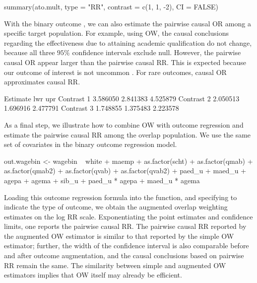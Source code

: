 \begin{example}
summary(ato.mult, type = "RR", contrast = c(1, 1, -2), CI = FALSE)
\end{example}

 
With the binary outcome , we can also estimate the pairwise causal OR among a specific target population. For example, using OW, the causal conclusions regarding the effectiveness due to attaining academic qualification do not change, because all three $95\%$ confidence intervals exclude null. However, the pairwise causal OR appear larger than the pairwise causal RR. This is expected because our outcome of interest is not uncommon \citep{nurminen1995use}. For rare outcomes, causal OR approximates causal RR. 


\begin{Soutput}
          Estimate      lwr      upr
Contrast 1 3.586050 2.841383 4.525879
Contrast 2 2.050513 1.696916 2.477791
Contrast 3 1.748855 1.375483 2.223578
\end{Soutput}

As a final step, we illustrate how to combine OW with outcome regression and estimate the pairwise causal RR among the overlap population. 
We use the same set of covariates in the binary outcome regression model.

\begin{example}
 out.wagebin <- wagebin ~ white + maemp + as.factor(scht) + as.factor(qmab) +
    as.factor(qmab2) + as.factor(qvab) + as.factor(qvab2) + paed_u + maed_u +
    agepa + agema + sib_u + paed_u * agepa + maed_u * agema
\end{example}


Loading this outcome regression formula into the  function, and specifying  to indicate the type of outcome, we obtain the augmented overlap weighting estimates on the log RR scale. Exponentiating the point estimates and confidence limits, one reports the pairwise causal RR. The pairwise causal RR reported by the augmented OW estimator is similar to that reported by the simple OW estimator; further, the width of the confidence interval is also comparable before and after outcome augmentation, and the causal conclusions based on pairwise RR remain the same. The similarity between simple and augmented OW estimators implies that OW itself may already be efficient.

